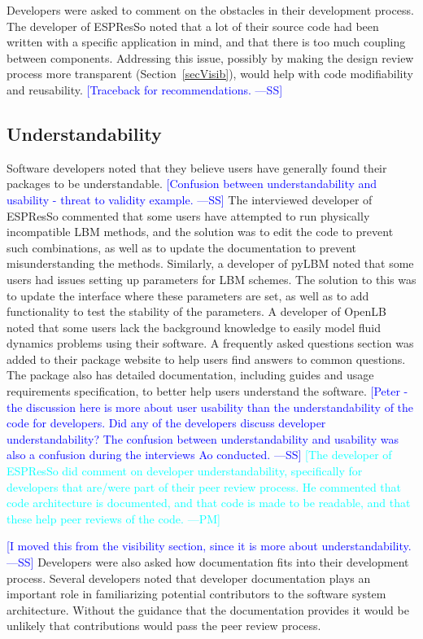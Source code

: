 \documentclass[final, 3p, times, authoryear]{elsarticle}
\newcommand{\authornote}[3]{\textcolor{#1}{[#3 ---#2]}}
\newcommand{\authornote}[3]{}
\newcommand{\wss}[1]{\authornote{blue}{SS}{#1}} %
\newcommand{\pmm}[1]{\authornote{cyan}{PM}{#1}} %
\begin{document}
Developers were asked to comment on the obstacles in their development process.
The developer of ESPResSo noted that a lot of their source code had been written
with a specific application in mind, and that there is too much coupling between
components. Addressing this issue, possibly by making the design review process
more transparent (Section~\ref{secVisib}), would help with code modifiability
and reusability.  \wss{Traceback for recommendations.}

\subsection{Understandability}

Software developers noted that they believe users have generally found their
packages to be understandable. \wss{Confusion between understandability and
usability - threat to validity example.}  The interviewed developer of ESPResSo
commented that some users have attempted to run physically incompatible LBM
methods, and the solution was to edit the code to prevent such combinations, as
well as to update the documentation to prevent misunderstanding the methods.
Similarly, a developer of pyLBM noted that some users had issues setting up
parameters for LBM schemes. The solution to this was to update the interface
where these parameters are set, as well as to add functionality to test the
stability of the parameters. A developer of OpenLB noted that some users lack
the background knowledge to easily model fluid dynamics problems using their
software. A frequently asked questions section was added to their package
website to help users find answers to common questions. The package also has
detailed documentation, including guides and usage requirements specification,
to better help users understand the software. \wss{Peter - the discussion here
is more about user usability than the understandability of the code for
developers. Did any of the developers discuss developer understandability?  The
confusion between understandability and usability was also a confusion during
the interviews Ao conducted.} \pmm{The developer of ESPResSo did comment on
developer understandability, specifically for developers that are/were part of
their peer review process. He commented that code architecture is documented,
and that code is made to be readable, and that these help peer reviews of the
code.}

\wss{I moved this from the visibility section, since it is more about
understandability.}  Developers were also asked how documentation fits into their
development process. Several developers noted that developer documentation plays
an important role in familiarizing potential contributors to the software system
architecture. Without the guidance that the documentation provides it would be
unlikely that contributions would pass the peer review process. 
\end{document}
